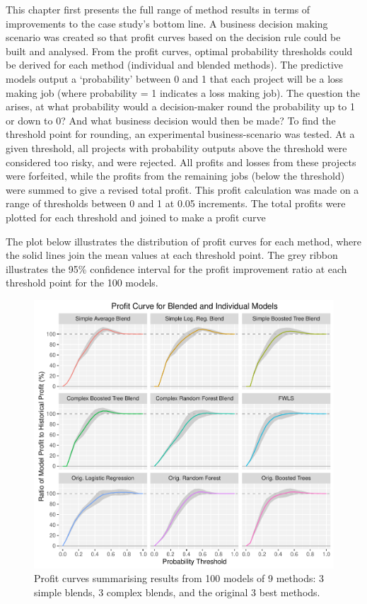 \documentclass[]{elsarticle} %
\makeatletter
\def\maxwidth{\ifdim\Gin@nat@width>\linewidth\linewidth
\else\Gin@nat@width\fi}
\let\Oldincludegraphics\includegraphics
\renewcommand{\includegraphics}[1]{\Oldincludegraphics[width=\maxwidth]{#1}}
\makeatother
\begin{document}
This chapter first presents the full range of method results in terms of
improvements to the case study's bottom line. A business decision making
scenario was created so that profit curves based on the decision rule
could be built and analysed. From the profit curves, optimal probability
thresholds could be derived for each method (individual and blended
methods). The predictive models output a `probability' between 0 and 1
that each project will be a loss making job (where probability = 1
indicates a loss making job). The question the arises, at what
probability would a decision-maker round the probability up to 1 or down
to 0? And what business decision would then be made? To find the
threshold point for rounding, an experimental business-scenario was
tested. At a given threshold, all projects with probability outputs
above the threshold were considered too risky, and were rejected. All
profits and losses from these projects were forfeited, while the profits
from the remaining jobs (below the threshold) were summed to give a
revised total profit. This profit calculation was made on a range of
thresholds between 0 and 1 at 0.05 increments. The total profits were
plotted for each threshold and joined to make a profit curve

The plot below illustrates the distribution of profit curves for each
method, where the solid lines join the mean values at each threshold
point. The grey ribbon illustrates the 95\% confidence interval for the
profit improvement ratio at each threshold point for the 100 models.

\begin{figure}[htbp]
\centering
\includegraphics{Consulting_Profitability_Paper_files/figure-latex/profit_curve-1.pdf}
\caption{Profit curves summarising results from 100 models of 9 methods:
3 simple blends, 3 complex blends, and the original 3 best methods.}
\end{figure}
\end{document}
